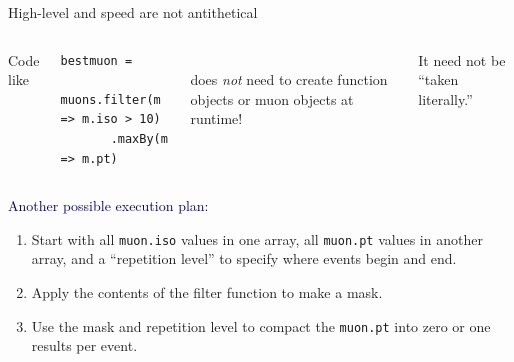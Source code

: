 \documentclass{beamer}
\begin{document}
\begin{frame}[fragile]{High-level and speed are not antithetical}
\vspace{0.5 cm}
\begin{columns}
Code like

\small
\begin{verbatim}
bestmuon =
  muons.filter(m => m.iso > 10)
       .maxBy(m => m.pt)
\end{verbatim}
\vspace{0.4 cm}

\\ does {\it not} need to create function objects or muon objects at runtime!

\vspace{0.2 cm}
It need not be ``taken literally.''
\end{columns}

\vspace{0.5 cm}
\textcolor{darkblue}{Another possible execution plan:}
\begin{enumerate}
\item Start with all {\tt\small muon.iso} values in one array, all {\tt\small muon.pt} values in another array, and a ``repetition level'' to specify where events begin and end.
\item Apply the contents of the filter function to make a mask.
\item Use the mask and repetition level to compact the {\tt\small muon.pt} into zero or one results per event.
\end{enumerate}
\end{frame}
\end{document}
